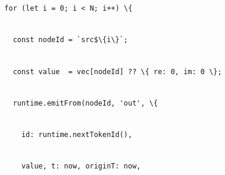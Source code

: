 \documentclass[
]{article}
\newcommand{\passthrough}[1]{#1}
\begin{document}
\passthrough{\lstinline!  !}\passthrough{\lstinline!for!}\passthrough{\lstinline! !}\passthrough{\lstinline!(!}\passthrough{\lstinline!let!}\passthrough{\lstinline! !}\passthrough{\lstinline!i!}\passthrough{\lstinline! !}\passthrough{\lstinline!=!}\passthrough{\lstinline! !}\passthrough{\lstinline!0;!}\passthrough{\lstinline! !}\passthrough{\lstinline!i!}\passthrough{\lstinline! !}\passthrough{\lstinline!<!}\passthrough{\lstinline! !}\passthrough{\lstinline!N!}\passthrough{\lstinline!;!}\passthrough{\lstinline! !}\passthrough{\lstinline!i!}\passthrough{\lstinline!++)!}\passthrough{\lstinline! !}\passthrough{\lstinline!\{!}\strut \\
\passthrough{\lstinline!    !}\passthrough{\lstinline!const!}\passthrough{\lstinline! !}\passthrough{\lstinline!nodeId!}\passthrough{\lstinline! !}\passthrough{\lstinline!=!}\passthrough{\lstinline! !}\passthrough{\lstinline!`!}\passthrough{\lstinline!src!}\passthrough{\lstinline!$\{!}\passthrough{\lstinline!i!}\passthrough{\lstinline!\}`;!}\strut \\
\passthrough{\lstinline!    !}\passthrough{\lstinline!const!}\passthrough{\lstinline! !}\passthrough{\lstinline!value!}\passthrough{\lstinline!  !}\passthrough{\lstinline!=!}\passthrough{\lstinline! !}\passthrough{\lstinline!vec!}\passthrough{\lstinline![!}\passthrough{\lstinline!nodeId!}\passthrough{\lstinline!]!}\passthrough{\lstinline! !}\passthrough{\lstinline!??!}\passthrough{\lstinline! !}\passthrough{\lstinline!\{!}\passthrough{\lstinline! !}\passthrough{\lstinline!re:!}\passthrough{\lstinline! !}\passthrough{\lstinline!0,!}\passthrough{\lstinline! !}\passthrough{\lstinline!im:!}\passthrough{\lstinline! !}\passthrough{\lstinline!0!}\passthrough{\lstinline! !}\passthrough{\lstinline!\};!}\strut \\
\passthrough{\lstinline!    !}\passthrough{\lstinline!runtime.emitFrom!}\passthrough{\lstinline!(!}\passthrough{\lstinline!nodeId!}\passthrough{\lstinline!,!}\passthrough{\lstinline! !}\passthrough{\lstinline!'out',!}\passthrough{\lstinline! !}\passthrough{\lstinline!\{!}\strut \\
\passthrough{\lstinline!      !}\passthrough{\lstinline!id:!}\passthrough{\lstinline! !}\passthrough{\lstinline!runtime.nextTokenId!}\passthrough{\lstinline!(),!}\strut \\
\passthrough{\lstinline!      !}\passthrough{\lstinline!value,!}\passthrough{\lstinline! !}\passthrough{\lstinline!t:!}\passthrough{\lstinline! !}\passthrough{\lstinline!now,!}\passthrough{\lstinline! !}\passthrough{\lstinline!originT!}\passthrough{\lstinline!:!}\passthrough{\lstinline! !}\passthrough{\lstinline!now,!}\strut \\
\end{document}
